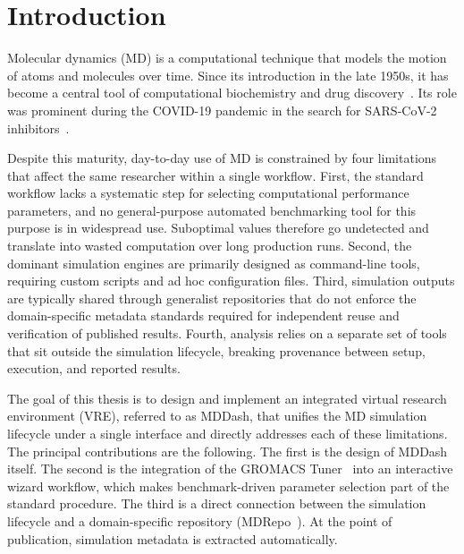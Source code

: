 \documentclass[
  digital,     %
  color,       %
  oneside,     %
  nosansbold,  %
  nocolorbold, %
  lof,         %
  lot,         %
]{fithesis4}
\begin{document}

\chapter{Introduction}

Molecular dynamics (MD) is a computational technique that models the motion of atoms and molecules over time. Since its introduction in the late 1950s, it has become a central tool of computational biochemistry and drug discovery~\cite{md_for_all}. Its role was prominent during the COVID-19 pandemic in the search for SARS-CoV-2 inhibitors~\cite{md_in_covid}.

Despite this maturity, day-to-day use of MD is constrained by four limitations that affect the same researcher within a single workflow. First, the standard workflow lacks a systematic step for selecting computational performance parameters, and no general-purpose automated benchmarking tool for this purpose is in widespread use. Suboptimal values therefore go undetected and translate into wasted computation over long production runs. Second, the dominant simulation engines are primarily designed as command-line tools, requiring custom scripts and ad hoc configuration files. Third, simulation outputs are typically shared through generalist repositories that do not enforce the domain-specific metadata standards required for independent reuse and verification of published results. Fourth, analysis relies on a separate set of tools that sit outside the simulation lifecycle, breaking provenance between setup, execution, and reported results.

The goal of this thesis is to design and implement an integrated virtual research environment (VRE), referred to as MDDash, that unifies the MD simulation lifecycle under a single interface and directly addresses each of these limitations. The principal contributions are the following. The first is the design of MDDash itself. The second is the integration of the GROMACS Tuner~\cite{gromacs_tuner} into an interactive wizard workflow, which makes benchmark-driven parameter selection part of the standard procedure. The third is a direct connection between the simulation lifecycle and a domain-specific repository (MDRepo~\cite{mdrepo_ui}). At the point of publication, simulation metadata is extracted automatically.
\end{document}

